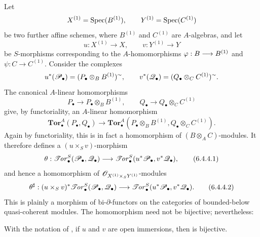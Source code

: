 \begin{env}[6.4.4]
\label{III.6.4.4}
Let
\[
  X^{(1)}=\operatorname{Spec}(B^{(1)}),
  \qquad
  Y^{(1)}=\operatorname{Spec}(C^{(1)})
\]
be two further affine schemes, where $B^{(1)}$ and $C^{(1)}$ are
$A$-algebras, and let
\[
  u:X^{(1)}\longrightarrow X,
  \qquad
  v:Y^{(1)}\longrightarrow Y
\]
be $S$-morphisms corresponding to the $A$-homomorphisms
$\varphi:B\longrightarrow B^{(1)}$ and
$\psi:C\longrightarrow C^{(1)}$.  Consider the complexes
\[
  u^*(\mathscr{P}_\bullet)
  =
  (P_\bullet\otimes_BB^{(1)})^{\sim},
  \qquad
  v^*(\mathscr{Q}_\bullet)
  =
  (Q_\bullet\otimes_CC^{(1)})^{\sim}.
\]
The canonical $A$-linear homomorphisms
\[
  P_\bullet\longrightarrow P_\bullet\otimes_BB^{(1)},
  \qquad
  Q_\bullet\longrightarrow Q_\bullet\otimes_CC^{(1)}
\]
give, by functoriality, an $A$-linear homomorphism
\[
  \mathbf{Tor}_\bullet^A(P_\bullet,Q_\bullet)
  \longrightarrow
  \mathbf{Tor}_\bullet^A
  (P_\bullet\otimes_BB^{(1)},
   Q_\bullet\otimes_CC^{(1)}).
\]
Again by functoriality, this is in fact a homomorphism of
$(B\otimes_AC)$-modules.  It therefore defines a
$(u\times_Sv)$-morphism
\[
  \theta:
  \mathscr{T}\!\mathit{or}_\bullet^S(\mathscr{P}_\bullet,\mathscr{Q}_\bullet)
  \longrightarrow
  \mathscr{T}\!\mathit{or}_\bullet^S(u^*\mathscr{P}_\bullet,v^*\mathscr{Q}_\bullet),
  \tag{6.4.4.1}\label{III.6.4.4.1}
\]
and hence a homomorphism of
$\mathscr{O}_{X^{(1)}\times_SY^{(1)}}$-modules
\[
  \theta^\sharp:
  (u\times_Sv)^*
  \mathscr{T}\!\mathit{or}_\bullet^S(\mathscr{P}_\bullet,\mathscr{Q}_\bullet)
  \longrightarrow
  \mathscr{T}\!\mathit{or}_\bullet^S(u^*\mathscr{P}_\bullet,v^*\mathscr{Q}_\bullet).
  \tag{6.4.4.2}\label{III.6.4.4.2}
\]
This is plainly a morphism of bi-$\partial$-functors on the
categories of bounded-below quasi-coherent modules.  The
homomorphism  need not be bijective; nevertheless:
\end{env}

\begin{lemma}[6.4.5]
\label{III.6.4.5}
With the notation of , if $u$ and $v$ are open
immersions, then  is bijective.
\end{lemma}

